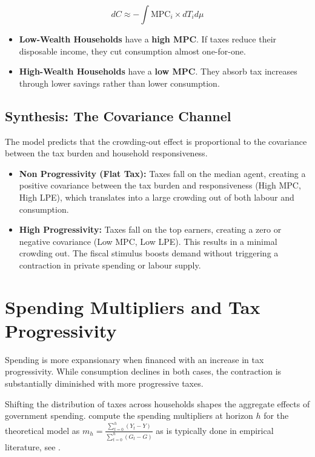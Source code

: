\documentclass[12pt,letterpaper]{article}
\begin{document}
\begin{equation}
    dC \approx - \int \text{MPC}_{i} \times dT_{i} d\mu
    \label{eq:consumption_response}
\end{equation}

\begin{itemize}
    \item \textbf{Low-Wealth Households} have a \textbf{high MPC}. If taxes reduce their disposable income, they cut consumption almost one-for-one.
    \item \textbf{High-Wealth Households} have a \textbf{low MPC}. They absorb tax increases through lower savings rather than lower consumption.
\end{itemize}

\subsection{Synthesis: The Covariance Channel}
The model predicts that the crowding-out effect is proportional to the covariance between the tax burden and household responsiveness.

\begin{itemize}
    \item \textbf{Non Progressivity (Flat Tax):} Taxes fall on the median agent, creating a positive covariance between the tax burden and responsiveness (High MPC, High LPE), which translates into a large crowding out of both labour and consumption.
    
    \item \textbf{High Progressivity:} Taxes fall on the top earners, creating a zero or negative covariance (Low MPC, Low LPE). This results in a minimal crowding out. The fiscal stimulus boosts demand without triggering a contraction in private spending or labour supply.
\end{itemize}


\section{Spending Multipliers and Tax Progressivity}
Spending is more expansionary when financed with an increase in tax progressivity. While consumption declines in both cases, the contraction is substantially diminished with more progressive taxes. 

Shifting the distribution of taxes across households shapes the aggregate effects of government spending.
\cite{FN} compute the spending multipliers at horizon $h$ for the theoretical model as $m_h = \frac{\sum^{h}_{t=0} (Y_t - Y)}{\sum^{h}_{t=0} (G_t - G)}$ as is typically done in empirical literature, see \cite{RameyZubairy2018, CaggianoCastelnuovo_NonLinear, Auerbach_Gorodnichenko_2012_Measuring}.
\end{document}
